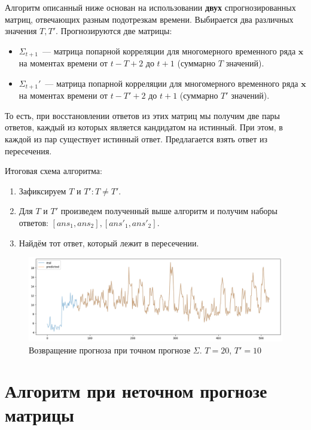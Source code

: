 \documentclass{article}
\begin{document}
Алгоритм описанный ниже основан на использовании \textbf{двух} спрогнозированных матриц, отвечающих разным подотрезкам времени. Выбирается два различных значения $T, T'$. Прогнозируются две матрицы:
\begin{itemize}
	\item $\Sigma_{t+1}$~--- матрица попарной корреляции для многомерного временного ряда $\mathbf{x}$ на моментах времени от $t-T+2$ до $t+1$ (суммарно $T$ значений).
	\item $\Sigma_{t+1}'$~--- матрица попарной корреляции для многомерного временного ряда $\mathbf{x}$ на моментах времени от $t-T'+2$ до $t+1$ (суммарно $T'$ значений).
\end{itemize}

То есть, при восстановлении ответов из этих матриц мы получим две пары ответов, каждый из которых является кандидатом на истинный. При этом, в каждой из пар существует истинный ответ. Предлагается взять ответ из пересечения.

Итоговая схема алгоритма:

\begin{enumerate}
	\item Зафиксируем $T$ и $T': T \neq T'$.
	\item Для $T$ и $T'$ произведем полученный выше алгоритм и получим наборы ответов: $[ans_1, ans_2], [ans'_1, ans'_2]$.
	\item Найдём тот ответ, который лежит в пересечении.
\end{enumerate}


\begin{figure}[H]
	\centering
	\includegraphics[width=\textwidth]{TwoTAlgo.png}
	\caption{Возвращение прогноза при точном прогнозе $\Sigma$. $T=20$, $T'=10$}
	\label{fig:fig3}
\end{figure}

\section{Алгоритм при неточном прогнозе матрицы}
\end{document}
